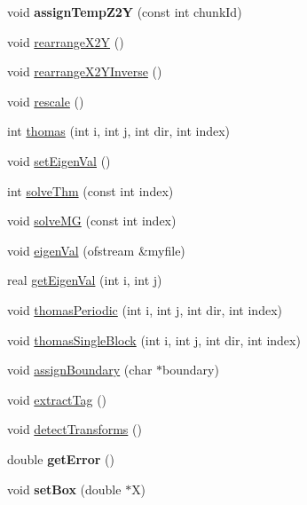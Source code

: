 \begin{DoxyCompactItemize}
void {\bfseries assign\+Temp\+Z2Y} (const int chunk\+Id)
\item 
void \mbox{\hyperlink{classPencilDcmp_ae3d801255b0af3835331825e42043a98}{rearrange\+X2Y}} ()
\item 
void \mbox{\hyperlink{classPencilDcmp_adf77ae1fe6ac288f290e7b588b5a235e}{rearrange\+X2\+Y\+Inverse}} ()
\item 
void \mbox{\hyperlink{classPencilDcmp_a33abfd41b7ea649af6c86f5611aeed79}{rescale}} ()
\item 
int \mbox{\hyperlink{classPencilDcmp_a536eab196adc27ccc36fa51dccf5606f}{thomas}} (int i, int j, int dir, int index)
\item 
void \mbox{\hyperlink{classPencilDcmp_aac2a7354c9e629510b8de6f96921788b}{set\+Eigen\+Val}} ()
\item 
int \mbox{\hyperlink{classPencilDcmp_a5eaf7b3581e2cbe3ee3595cd44154a73}{solve\+Thm}} (const int index)
\item 
void \mbox{\hyperlink{classPencilDcmp_a9a27e4f6c9f2b567009759c0c03506c1}{solve\+MG}} (const int index)
\item 
void \mbox{\hyperlink{classPencilDcmp_ac4b1060595d90c99e2b81cc0c4622f60}{eigen\+Val}} (ofstream \&myfile)
\item 
real \mbox{\hyperlink{classPencilDcmp_afa0acfd2badba2e06d1800f67fce3dba}{get\+Eigen\+Val}} (int i, int j)
\item 
void \mbox{\hyperlink{classPencilDcmp_a7afb77ba481af376247adf69b93d318c}{thomas\+Periodic}} (int i, int j, int dir, int index)
\item 
void \mbox{\hyperlink{classPencilDcmp_a2146f493283ffa68e46648205c9b6ab2}{thomas\+Single\+Block}} (int i, int j, int dir, int index)
\item 
void \mbox{\hyperlink{classPencilDcmp_abad58d40d070a52c2b2a8e7f90523ec4}{assign\+Boundary}} (char $\ast$boundary)
\item 
void \mbox{\hyperlink{classPencilDcmp_a68f53a914a7dca2ddc7078468fb8e0f5}{extract\+Tag}} ()
\item 
void \mbox{\hyperlink{classPencilDcmp_a6cdc6f82cdbf5ee0ee8e1da2810ed5b3}{detect\+Transforms}} ()
\item 
\mbox{\label{classPencilDcmp_a9d0f7acc7d71ffc350573ab2789f374e}} 
double {\bfseries get\+Error} ()
\item 
\mbox{\label{classPencilDcmp_ac0d8fbd9e8e021b3670e0557b131ca45}} 
void {\bfseries set\+Box} (double $\ast$X)

\end{DoxyCompactItemize}
